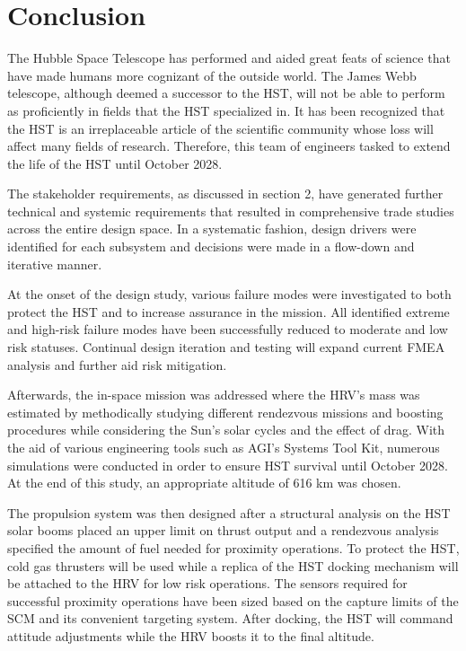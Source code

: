 \documentclass[paper=letter, fontsize=11pt]{scrartcl} %
\numberwithin{equation}{section} %
\numberwithin{figure}{section} %
\numberwithin{table}{section} %
\begin{document}

\section{Conclusion}

The Hubble Space Telescope has performed and aided great feats of science that have made humans more cognizant of the outside world. The James Webb telescope, although deemed a successor to the HST, will not be able to perform as proficiently in fields that the HST specialized in. It has been recognized that the HST is an irreplaceable article of the scientific community whose loss will affect many fields of research. Therefore, this team of engineers tasked to extend the life of the HST until October 2028.

The stakeholder requirements, as discussed in section 2, have generated further technical and systemic requirements that resulted in comprehensive trade studies across the entire design space. In a systematic fashion, design drivers were identified for each subsystem and decisions were made in a flow-down and iterative manner.

At the onset of the design study, various failure modes were investigated to both protect the HST and to increase assurance in the mission. All identified extreme and high-risk failure modes have been successfully reduced to moderate and low risk statuses. Continual design iteration and testing will expand current FMEA analysis and further aid risk mitigation.

Afterwards, the in-space mission was addressed where the HRV's mass was estimated by methodically studying different rendezvous missions and boosting procedures while considering the Sun's solar cycles and the effect of drag. With the aid of various engineering tools such as AGI's Systems Tool Kit, numerous simulations were conducted in order to ensure HST survival until October 2028. At the end of this study, an appropriate altitude of 616 km was chosen.

The propulsion system was then designed after a structural analysis on the HST solar booms placed an upper limit on thrust output and a rendezvous analysis specified the amount of fuel needed for proximity operations. To protect the HST, cold gas thrusters will be used while a replica of the HST docking mechanism will be attached to the HRV for low risk operations. The sensors required for successful proximity operations have been sized based on the capture limits of the SCM and its convenient targeting system.  After docking, the HST will command attitude adjustments while the HRV boosts it to the final altitude.
\end{document}
